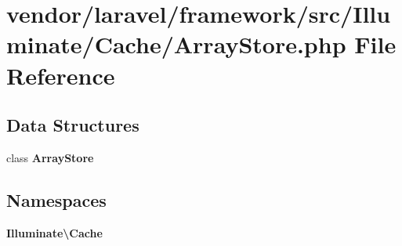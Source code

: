 \section{vendor/laravel/framework/src/\+Illuminate/\+Cache/\+Array\+Store.php File Reference}
\label{_array_store_8php}
\subsection*{Data Structures}
\begin{DoxyCompactItemize}
\item 
class {\bf Array\+Store}
\end{DoxyCompactItemize}
\subsection*{Namespaces}
\begin{DoxyCompactItemize}
\item 
 {\bf Illuminate\textbackslash{}\+Cache}
\end{DoxyCompactItemize}
